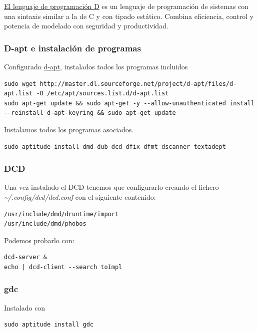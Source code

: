 \documentclass[12pt,spanish,]{scrartcl}
\begin{document}
\href{https://dlang.org/}{El lenguaje de programación D} es un lenguaje
de programación de sistemas con una sintaxis similar a la de C y con
tipado estático. Combina eficiencia, control y potencia de modelado con
seguridad y productividad.

\subsubsection{D-apt e instalación de
programas}\label{d-apt-e-instalaciuxf3n-de-programas}

Configurado \href{http://d-apt.sourceforge.net/}{d-apt}, instalados
todos los programas incluidos

\begin{verbatim}
sudo wget http://master.dl.sourceforge.net/project/d-apt/files/d-apt.list -O /etc/apt/sources.list.d/d-apt.list
sudo apt-get update && sudo apt-get -y --allow-unauthenticated install --reinstall d-apt-keyring && sudo apt-get update
\end{verbatim}

Instalamos todos los programas asociados.

\begin{verbatim}
sudo aptitude install dmd dub dcd dfix dfmt dscanner textadept
\end{verbatim}

\subsubsection{DCD}\label{dcd}

Una vez instalado el DCD tenemos que configurarlo creando el fichero
\emph{\textasciitilde{}/.config/dcd/dcd.conf} con el siguiente
contenido:

\begin{verbatim}
/usr/include/dmd/druntime/import
/usr/include/dmd/phobos
\end{verbatim}

Podemos probarlo con:

\begin{verbatim}
dcd-server &
echo | dcd-client --search toImpl
\end{verbatim}

\subsubsection{gdc}\label{gdc}

Instalado con

\begin{verbatim}
sudo aptitude install gdc
\end{verbatim}
\end{document}

